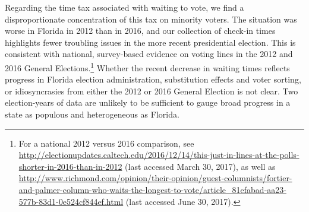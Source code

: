 \documentclass[12pt,titlepage]{article}
\begin{document}



Regarding the time tax associated with waiting to vote, we find a
disproportionate concentration of this tax on minority voters.  The
situation was worse in Florida in 2012 than in 2016, and our
collection of check-in times highlights fewer troubling issues in the
more recent presidential election.  This is consistent with national,
survey-based evidence on voting lines in the 2012 and 2016 General
Elections.\footnote{For a national 2012 versus 2016 comparison, see
  \url{http://electionupdates.caltech.edu/2016/12/14/this-just-in-lines-at-the-polls-shorter-in-2016-than-in-2012}
  (last accessed March 30, 2017), as well as
  \url{http://www.richmond.com/opinion/their-opinion/guest-columnists/fortier-and-palmer-column-who-waits-the-longest-to-vote/article_81efabad-aa23-577b-83d1-0e524cf844ef.html}
  (last accessed June 30, 2017).}  Whether the recent decrease in
waiting times reflects progress in Florida election administration,
substitution effects and voter sorting, or idiosyncrasies from either
the 2012 or 2016 General Election is not clear.  Two election-years of
data are unlikely to be sufficient to gauge broad progress in a state
as populous and heterogeneous as Florida.
\end{document}
